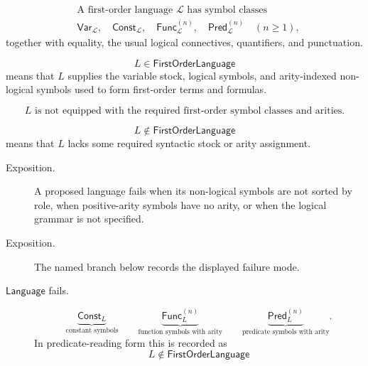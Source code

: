 \begin{remark*}
\[
\begin{aligned}
&\text{A first-order language } \mathcal L \text{ has symbol classes}\\
&\mathsf{Var}_{\mathcal L},\quad
\mathsf{Const}_{\mathcal L},\quad
\mathsf{Func}_{\mathcal L}^{(n)},\quad
\mathsf{Pred}_{\mathcal L}^{(n)}
\quad(n\geq 1),
\end{aligned}
\]
together with equality, the usual logical connectives, quantifiers, and
punctuation.
\end{remark*}

\begin{remark*}
\[
  L\in\mathsf{FirstOrderLanguage}
\] means that \(L\) supplies the variable
stock, logical symbols, and arity-indexed non-logical symbols used to form
first-order terms and formulas.
\end{remark*}

\begin{remark*}
\[
L \text{ is not equipped with the required first-order symbol classes and arities.}
\]
\end{remark*}

\begin{remark*}
\[
  L\notin\mathsf{FirstOrderLanguage}
\] means that \(L\) lacks some
required syntactic stock or arity assignment.
\end{remark*}

\begin{remark*}
\begin{description}
  \item[Exposition.] A proposed language fails when its non-logical symbols are not sorted by role,
when positive-arity symbols have no arity, or when the logical grammar is not
specified.
\end{description}
\end{remark*}

\begin{remark*}
\begin{description}
  \item[Exposition.] The named branch below records the displayed failure mode.
\item[\(\mathsf{Language}\) fails.] \[
\underbrace{\mathsf{Const}_{L}}_{\text{constant symbols}}
\qquad
\underbrace{\mathsf{Func}_{L}^{(n)}}_{\text{function symbols with arity}}
\qquad
\underbrace{\mathsf{Pred}_{L}^{(n)}}_{\text{predicate symbols with arity}}.
\]
  In predicate-reading form this is recorded as
  \[
    L\notin\mathsf{FirstOrderLanguage}
  \]
\end{description}
\end{remark*}

